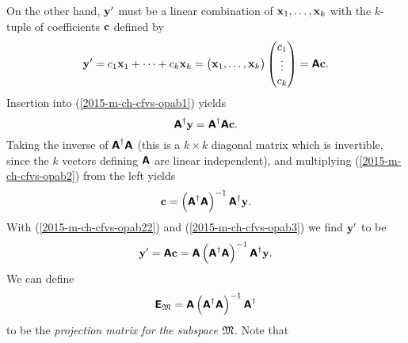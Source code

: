 On the other hand, ${\bf y}'$ must be a linear combination of
${\bf x}_1,\ldots ,{\bf x}_k$ with the $k$-tuple of coefficients ${\bf c}$ defined by
\begin{equation}
{\bf y}'
=
c_1 {\bf x}_1 + \cdots + c_k {\bf x}_k
=
\begin{pmatrix}{\bf x}_1, \ldots ,{\bf x}_k
\end{pmatrix}
\begin{pmatrix} c_1\\ \vdots \\ c_k
\end{pmatrix}
=
\textsf{\textbf{A}}  {\bf c}
.
\label{2015-m-ch-cfvs-opab22}
\end{equation}
Insertion into (\ref{2015-m-ch-cfvs-opab1}) yields
\begin{equation}
\textsf{\textbf{A}}^\dagger  {\bf y}
=
\textsf{\textbf{A}}^\dagger  \textsf{\textbf{A}} {\bf c}
.
\label{2015-m-ch-cfvs-opab2}
\end{equation}
Taking the inverse of $\textsf{\textbf{A}}^\dagger  \textsf{\textbf{A}} $
(this is a $k \times k$ diagonal matrix which is invertible, since
the $k$ vectors defining $\textsf{\textbf{A}}$ are linear independent),
and multiplying (\ref{2015-m-ch-cfvs-opab2}) from the left yields
\begin{equation}
{\bf c}
=
\left(\textsf{\textbf{A}}^\dagger  \textsf{\textbf{A}} \right)^{-1} \textsf{\textbf{A}}^\dagger {\bf y}
.
\label{2015-m-ch-cfvs-opab3}
\end{equation}
With (\ref{2015-m-ch-cfvs-opab22}) and (\ref{2015-m-ch-cfvs-opab3})
we find ${\bf y}'$ to be
\begin{equation}
{\bf y}'
=
\textsf{\textbf{A}}  {\bf c} =
\textsf{\textbf{A}}  \left(\textsf{\textbf{A}}^\dagger  \textsf{\textbf{A}} \right)^{-1} \textsf{\textbf{A}}^\dagger {\bf y}
.
\label{2015-m-ch-cfvs-opab4}
\end{equation}
We can define
\begin{equation}
\textsf{\textbf{E}}_{{\frak M}}=
\textsf{\textbf{A}}  \left(\textsf{\textbf{A}}^\dagger  \textsf{\textbf{A}} \right)^{-1} \textsf{\textbf{A}}^\dagger
\label{2015-m-ch-cfvs-opab5}
\end{equation}
to be the {\em projection matrix for the subspace ${\frak M}$}.
Note that
